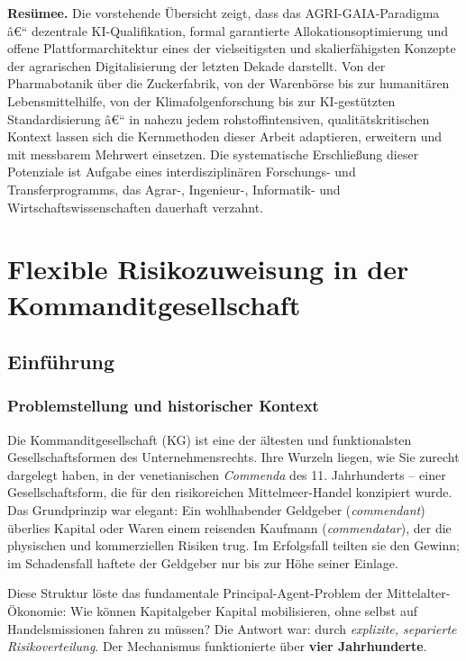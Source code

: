 \documentclass[a4paper, 12pt, twoside, openright]{report}
\theoremstyle{definition}
\theoremstyle{definition}
\begin{document}
\bigskip
\noindent
\textbf{Resümee.}
Die vorstehende Übersicht zeigt, dass das AGRI-GAIA-Paradigma â€“
dezentrale KI-Qualifikation, formal garantierte Allokationsoptimierung
und offene Plattformarchitektur eines der vielseitigsten und
skalierfähigsten Konzepte der agrarischen Digitalisierung der letzten
Dekade darstellt. Von der Pharmabotanik über die Zuckerfabrik, von
der Warenbörse bis zur humanitären Lebensmittelhilfe, von der
Klimafolgenforschung bis zur KI-gestützten Standardisierung â€“
in nahezu jedem rohstoffintensiven, qualitätskritischen Kontext
lassen sich die Kernmethoden dieser Arbeit adaptieren, erweitern und
mit messbarem Mehrwert einsetzen. Die systematische Erschließung
dieser Potenziale ist Aufgabe eines interdisziplinären Forschungs-
und Transferprogramms, das Agrar-, Ingenieur-, Informatik-
und Wirtschaftswissenschaften dauerhaft verzahnt.

\cleardoublepage

\chapter{Flexible Risikozuweisung in der Kommanditgesellschaft}
\label{ch:risk-allocation}

\section{Einführung}

\subsection{Problemstellung und historischer Kontext}

Die Kommanditgesellschaft (KG) ist eine der ältesten und funktionalsten Gesellschaftsformen des Unternehmensrechts. Ihre Wurzeln liegen, wie Sie zurecht dargelegt haben, in der venetianischen \emph{Commenda} des 11. Jahrhunderts -- einer Gesellschaftsform, die für den risikoreichen Mittelmeer-Handel konzipiert wurde. Das Grundprinzip war elegant: Ein wohlhabender Geldgeber (\emph{commendant}) überlies Kapital oder Waren einem reisenden Kaufmann (\emph{commendatar}), der die physischen und kommerziellen Risiken trug. Im Erfolgsfall teilten sie den Gewinn; im Schadensfall haftete der Geldgeber nur bis zur Höhe seiner Einlage.

Diese Struktur löste das fundamentale Principal-Agent-Problem der Mittelalter-Ökonomie: Wie können Kapitalgeber Kapital mobilisieren, ohne selbst auf Handelsmissionen fahren zu müssen? Die Antwort war: durch \emph{explizite, separierte Risikoverteilung}. Der Mechanismus funktionierte über \textbf{vier Jahrhunderte}.
\end{document}
